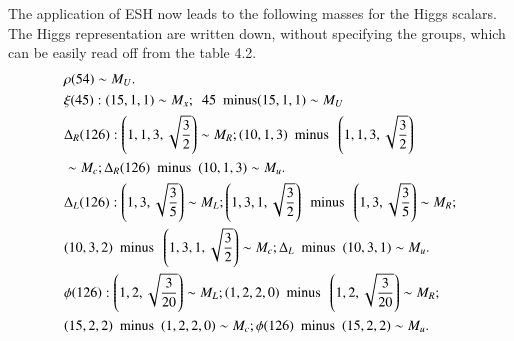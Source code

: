 The application of ESH now leads to the following masses for the Higgs scalars. The Higgs representation are written down, without specifying the groups, which can be easily read off from the table 4.2.
\begin{align*}
&\rho (54) \sim M_{U}.\\
&\xi  (45) : (15,1,1) \sim M_{x};~~ 45~~ {\rm minus} (15,1,1) \sim M_{U}\\
&\Delta_{R}(126) : \left(1,1,3, \sqrt{\frac{3}{2}}\right) \sim M_{R}; (10,1,3)~~ {\rm minus}~~ \left(1,1,3, \sqrt{{\frac{3}{2}}}\right)\\
&\sim M_{c}; \Delta_{R} (126)~~ {\rm minus}~~ (10,1,3)\sim M_{u}.\\
&\Delta_{L}(126): \left(1,3, \sqrt{\frac{3}{5}}\right)\sim M_{L}; \left(1,3,1,\sqrt{\frac{3}{2}}\right) ~~{\rm minus}~~ \left(1, 3, \sqrt{\frac{3}{5}}\right) \sim M_{R};\\
& (10,3,2)~~ {\rm minus}~~ \left(1,3,1, \sqrt{\frac{3}{2}}\right)\sim M_{c}; \Delta_{L}~~ {\rm minus}~~ (10,3,1)\sim M_{u}.\\
&\phi (126) : \left(1,2, \sqrt{\frac{3}{20}}\right)\sim M_{L}; (1,2,2,0) ~~{\rm minus}~~ \left(1,2, \sqrt{\frac{3}{20}}\right) \sim M_{R};\\
&(15,2,2)~~ {\rm minus}~~ (1,2,2,0) \sim M_{c}; \phi (126) ~~{\rm minus}~~ (15,2,2)\sim M_{u}.
\end{align*}

